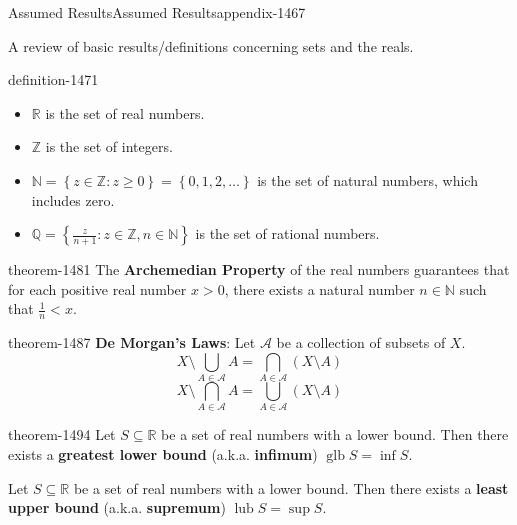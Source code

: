 \documentclass[oneside,10pt,]{article}
\newcommand{\terminology}[1]{\textbf{#1}}
\newcommand{\mb}{\mathbb}
\newcommand{\mc}{\mathcal}
\newcommand{\glb}{\operatorname{glb}}
\newcommand{\lub}{\operatorname{lub}}
\newcommand{\setBuilder}[2]{\left\{#1:#2\right\}}
\newcommand{\setList}[1]{\left\{#1\right\}}
\newcommand{\lt}{<}
\begin{document}
\begin{appendixptx}{Assumed Results}{}{Assumed Results}{}{}{appendix-1467}
\begin{introduction}{}%
\hypertarget{p-1470}{}%
A review of basic results\slash{}definitions concerning sets and the reals.%
\end{introduction}%
\begin{definition}{}{definition-1471}%
\leavevmode%
\begin{itemize}[label=\textbullet]
\item{}\(\mb R\) is the set of real numbers.%
\item{}\(\mb Z\) is the set of integers.%
\item{}\(\mb N=\setBuilder{z\in\mb Z}{z\geq 0}=\setList{0,1,2,\dots}\) is the set of natural numbers, which includes zero.%
\item{}\(\mb Q=\setBuilder{\frac{z}{n+1}}{z\in\mb Z,n\in\mb N}\) is the set of rational numbers.%
\end{itemize}
\end{definition}
\begin{theorem}{}{}{theorem-1481}%
\hypertarget{p-1482}{}%
The \terminology{Archemedian Property} of the real numbers guarantees that for each positive real number \(x>0\), there exists a natural number \(n\in\mb N\) such that \(\frac{1}{n}\lt x\).%
\end{theorem}
\begin{theorem}{}{}{theorem-1487}%
\hypertarget{p-1488}{}%
\terminology{De Morgan's Laws}: Let \(\mc A\) be a collection of subsets of \(X\).%
%
\begin{equation*}
X\setminus\bigcup_{A\in\mc A}A=\bigcap_{A\in\mc A}(X\setminus A)
\end{equation*}
%
\begin{equation*}
X\setminus\bigcap_{A\in\mc A}A=\bigcup_{A\in\mc A}(X\setminus A)
\end{equation*}
\end{theorem}
\begin{theorem}{}{}{theorem-1494}%
\hypertarget{p-1495}{}%
Let \(S\subseteq \mb R\) be a set of real numbers with a lower bound. Then there exists a \terminology{greatest lower bound} (a.k.a. \terminology{infimum}) \(\glb S=\inf S\).%
\par
\hypertarget{p-1500}{}%
Let \(S\subseteq \mb R\) be a set of real numbers with a lower bound. Then there exists a \terminology{least upper bound} (a.k.a. \terminology{supremum}) \(\lub S=\sup S\).%
\end{theorem}
\end{appendixptx}
\end{document}

